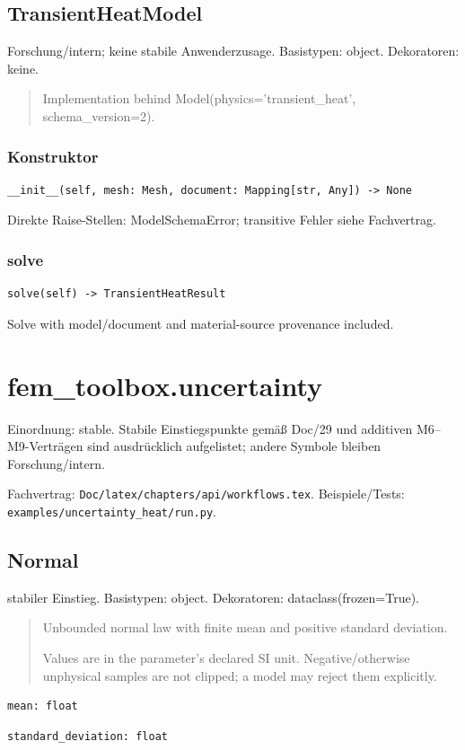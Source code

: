 \subsection{TransientHeatModel}
Forschung/intern; keine stabile Anwenderzusage.
Basistypen: object. Dekoratoren: keine.
\begin{quote}
Implementation behind Model(physics='transient\_heat', schema\_version=2).
\end{quote}
\subsubsection*{Konstruktor}
\begin{lstlisting}
__init__(self, mesh: Mesh, document: Mapping[str, Any]) -> None
\end{lstlisting}
Direkte Raise-Stellen: ModelSchemaError; transitive Fehler siehe Fachvertrag.
\subsubsection*{solve}
\begin{lstlisting}
solve(self) -> TransientHeatResult
\end{lstlisting}
Solve with model/document and material-source provenance included.
\section{fem\_toolbox.uncertainty}
Einordnung: stable. Stabile Einstiegspunkte gemäß Doc/29 und additiven M6–M9-Verträgen sind ausdrücklich aufgelistet; andere Symbole bleiben Forschung/intern.
\par Fachvertrag: \nolinkurl{Doc/latex/chapters/api/workflows.tex}. Beispiele/Tests:
\nolinkurl{examples/uncertainty_heat/run.py}.
\subsection{Normal}
stabiler Einstieg.
Basistypen: object. Dekoratoren: dataclass(frozen=True).
\begin{quote}
Unbounded normal law with finite mean and positive standard deviation.\par Values are in the parameter's declared SI unit. Negative/otherwise unphysical samples are not clipped; a model may reject them explicitly.
\end{quote}
\begin{lstlisting}
mean: float
\end{lstlisting}
\begin{lstlisting}
standard_deviation: float
\end{lstlisting}
